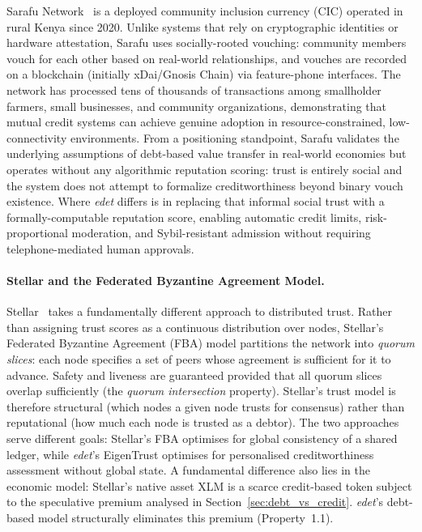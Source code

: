 \documentclass[11pt]{article}
\begin{document}
Sarafu Network~\cite{ruddick2021} is a deployed community inclusion currency (CIC) operated in rural Kenya since 2020. Unlike systems that rely on cryptographic identities or hardware attestation, Sarafu uses socially-rooted vouching: community members vouch for each other based on real-world relationships, and vouches are recorded on a blockchain (initially xDai/Gnosis Chain) via feature-phone interfaces. The network has processed tens of thousands of transactions among smallholder farmers, small businesses, and community organizations, demonstrating that mutual credit systems can achieve genuine adoption in resource-constrained, low-connectivity environments. From a positioning standpoint, Sarafu validates the underlying assumptions of debt-based value transfer in real-world economies but operates without any algorithmic reputation scoring: trust is entirely social and the system does not attempt to formalize creditworthiness beyond binary vouch existence. Where \emph{edet} differs is in replacing that informal social trust with a formally-computable reputation score, enabling automatic credit limits, risk-proportional moderation, and Sybil-resistant admission without requiring telephone-mediated human approvals.

\paragraph{Stellar and the Federated Byzantine Agreement Model.}
Stellar~\cite{mazieres2015} takes a fundamentally different approach to distributed trust. Rather than assigning trust scores as a continuous distribution over nodes, Stellar's Federated Byzantine Agreement (FBA) model partitions the network into \emph{quorum slices}: each node specifies a set of peers whose agreement is sufficient for it to advance. Safety and liveness are guaranteed provided that all quorum slices overlap sufficiently (the \emph{quorum intersection} property). Stellar's trust model is therefore structural (which nodes a given node trusts for consensus) rather than reputational (how much each node is trusted as a debtor). The two approaches serve different goals: Stellar's FBA optimises for global consistency of a shared ledger, while \emph{edet}'s EigenTrust optimises for personalised creditworthiness assessment without global state. A fundamental difference also lies in the economic model: Stellar's native asset XLM is a scarce credit-based token subject to the speculative premium analysed in Section~\ref{sec:debt_vs_credit}. \emph{edet}'s debt-based model structurally eliminates this premium (Property~1.1).
\end{document}
